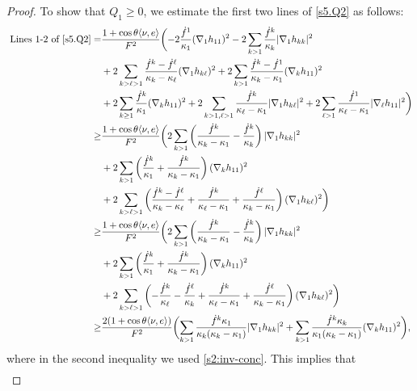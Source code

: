 \documentclass[11pt,reqno]{amsart}
\theoremstyle{definition}
\theoremstyle{remark}
\numberwithin{equation}{section}
\renewcommand{\(}{\left(}
\renewcommand{\)}{\right)}
\renewcommand{\-}{\overline}
\renewcommand{\k}{\kappa}
\renewcommand{\t}{\theta}
\begin{document}
\begin{proof}
 To show that $Q_1\geq 0$, we  estimate the first two lines of \eqref{s5.Q2} as follows:
  \begin{align*}
   \text{ Lines 1-2 of }\eqref{s5.Q2}= & \frac{1+\cos\t\langle \nu,e\rangle}{F^2}\biggl( -2\frac{\dot{f}^1}{\kappa_1}(\nabla_1h_{11})^2-2 \sum_{k>1}\frac{\dot{f}^k}{\k_k}|\nabla_1 h_{kk}|^2\nonumber\\
   &+2\sum_{k>\ell>1}\frac{\dot{f}^k-\dot{f}^\ell}{\kappa_k-\kappa_\ell}(\nabla_1h_{k\ell})^2+2\sum_{k>1}\frac{\dot{f}^k-\dot{f}^1}{\kappa_k-\kappa_1}(\nabla_kh_{11})^2\nonumber\\
     &+2\sum_{k\geq 1}\frac{\dot{f}^k}{\kappa_1}(\nabla_kh_{11})^2+2\sum_{k>1,\ell>1}\frac{\dot{f}^{k}}{\kappa_{\ell}-\kappa_1}|\nabla_1 h_{k\ell}|^2+2\sum_{\ell>1}\frac{\dot{f}^{1}}{\kappa_{\ell}-\kappa_1}|\nabla_\ell h_{11}|^2\biggr)\nonumber\\
   \geq & \frac{1+\cos\t\langle \nu,e\rangle}{F^2}\biggl( 2 \sum_{k>1}\left(\frac{\dot{f}^{k}}{\kappa_{k}-\kappa_1}-\frac{\dot{f}^k}{\k_k}\right)|\nabla_1 h_{kk}|^2\nonumber\\
   &+2\sum_{k>1}\left(\frac{\dot{f}^k}{\kappa_1}+\frac{\dot{f}^k}{\kappa_k-\kappa_1}\right)(\nabla_kh_{11})^2\nonumber\\
     &+2\sum_{k>\ell>1}\left(\frac{\dot{f}^k-\dot{f}^\ell}{\kappa_k-\kappa_\ell}+\frac{\dot{f}^{k}}{\kappa_{\ell}-\kappa_1}+\frac{\dot{f}^{\ell}}{\kappa_{k}-\kappa_1}\right)(\nabla_1h_{k\ell})^2\biggr)\nonumber\\
      \geq & \frac{1+\cos\t\langle \nu,e\rangle}{F^2}\biggl( 2 \sum_{k>1}\left(\frac{\dot{f}^{k}}{\kappa_{k}-\kappa_1}-\frac{\dot{f}^k}{\k_k}\right)|\nabla_1 h_{kk}|^2\nonumber\\
   &+2\sum_{k>1}\left(\frac{\dot{f}^k}{\kappa_1}+\frac{\dot{f}^k}{\kappa_k-\kappa_1}\right)(\nabla_kh_{11})^2\nonumber\\
     &+2\sum_{k>\ell>1}\left(-\frac{\dot{f}^k}{\kappa_\ell}-\frac{\dot{f}^\ell}{\kappa_k}+\frac{\dot{f}^{k}}{\kappa_{\ell}-\kappa_1}+\frac{\dot{f}^{\ell}}{\kappa_{k}-\kappa_1}\right)(\nabla_1h_{k\ell})^2\biggr)\nonumber\\
     \geq& \frac{2(1+\cos\t\langle \nu,e\rangle)}{F^2}\biggl( \sum_{k>1}\frac{\dot{f}^{k}\kappa_1}{\kappa_k(\kappa_{k}-\kappa_1)}|\nabla_1 h_{kk}|^2+\sum_{k>1}\frac{\dot{f}^k\kappa_k}{\kappa_1(\kappa_k-\kappa_1)}(\nabla_kh_{11})^2\biggr),
  \end{align*}
where in the second inequality we used \eqref{s2:inv-conc}.   This implies that
      \begin{align}\label{s5.Q2-1}

\end{align}
\end{proof}
\end{document}
